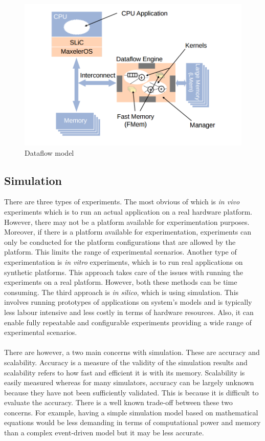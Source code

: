 \documentclass[a4paper,11pt]{article}
\begin{document}
\begin{figure}[H]
	\centering
	\includegraphics[scale=0.5]{images/DFEarchitecture}
	\caption{Dataflow model\cite{maxeler}}
\end{figure}



\subsection{Simulation}
There are three types of experiments. The most obvious of which is \textit{in vivo} experiments which is to run an actual application on a real hardware platform. However, there may not be a platform available for experimentation purposes. Moreover, if there is a platform available for experimentation, experiments can only be conducted for the platform configurations that are allowed by the platform. This limits the range of experimental scenarios. Another type of experimentation is \textit{in vitro} experiments, which is to run real applications on synthetic platforms. This approach takes care of the issues with running the experiments on a real platform. However, both these methods can be time consuming. The third approach is \textit{in silico}, which is using simulation. This involves running prototypes of applications on system's models and is typically less labour intensive and less costly in terms of hardware resources. Also, it can enable fully repeatable and configurable experiments providing a wide range of experimental scenarios.
\\\\
There are however, a two main concerns with simulation. These are accuracy and scalability. Accuracy is a measure of the validity of the simulation results and scalability refers to how fast and efficient it is with its memory.  Scalability is easily measured whereas for many simulators, accuracy can be largely unknown because they have not been sufficiently validated. This is because it is difficult to evaluate the accuracy. There is a well known trade-off between these two concerns. For example, having a simple simulation model based on mathematical equations would be less demanding in terms of computational power and memory than a complex event-driven model but it may be less accurate. 
\end{document}
